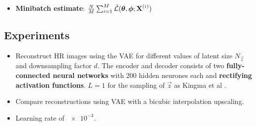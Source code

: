 

\begin{itemize}
	\item \textbf{Minibatch estimate}: $\frac{N}{M}\sum^{M}_{i=1}\tilde{\mathcal{L}}(\bm{\mathrm{\theta}},\bm{\mathrm{\phi}};\bm{\mathrm{X}}^{(i)})$
\end{itemize}




\subsection{Experiments}
\label{sub:experiments}


\begin{itemize}
	\item Reconstruct HR images using the VAE for different values of latent size $N_{\vec{z}}$ and downsampling factor $d$. The encoder and decoder consists of two \textbf{fully-connected neural networks} with $200$ hidden neurones each and \textbf{rectifying activation functions}. $L = 1$ for the sampling of $\vec{z}$ as Kingma et al \cite{Kingma2013}.
	\item Compare reconstructions using VAE with a bicubic interpolation upscaling.
	\item Learning rate of $\num{e-3}$.
\end{itemize}
